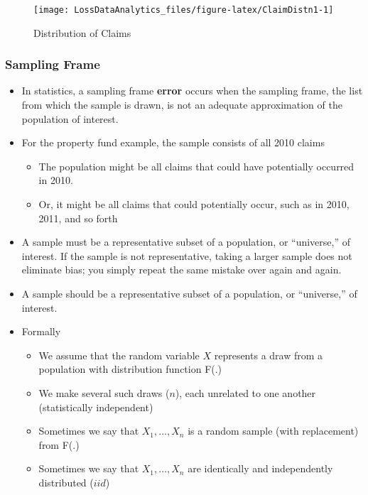 \documentclass[]{book}
\begin{document}
\begin{figure}

{\centering \texttt{[image: LossDataAnalytics\_files/figure-latex/ClaimDistn1-1]} 

}

\caption{Distribution of Claims}\label{fig:ClaimDistn1}
\end{figure}

\subsubsection{Sampling Frame}\label{sampling-frame}

\begin{itemize}
\item
  In statistics, a sampling frame \textbf{error} occurs when the
  sampling frame, the list from which the sample is drawn, is not an
  adequate approximation of the population of interest.
\item
  For the property fund example, the sample consists of all 2010 claims

  \begin{itemize}
  \item
    The population might be all claims that could have potentially
    occurred in 2010.
  \item
    Or, it might be all claims that could potentially occur, such as in
    2010, 2011, and so forth
  \end{itemize}
\item
  A sample must be a representative subset of a population, or
  ``universe,'' of interest. If the sample is not representative, taking
  a larger sample does not eliminate bias; you simply repeat the same
  mistake over again and again.
\item
  A sample should be a representative subset of a population, or
  ``universe,'' of interest.
\item
  Formally

  \begin{itemize}
  \item
    We assume that the random variable \(X\) represents a draw from a
    population with distribution function F(.)
  \item
    We make several such draws (\(n\)), each unrelated to one another
    (statistically independent)
  \item
    Sometimes we say that \(X_1, \ldots, X_n\) is a random sample (with
    replacement) from F(.)
  \item
    Sometimes we say that \(X_1, \ldots, X_n\) are identically and
    independently distributed (\(iid\))
  \end{itemize}
\end{itemize}
\end{document}
